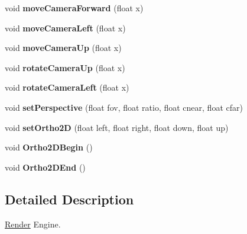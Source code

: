 \begin{DoxyCompactItemize}
\item 
\hypertarget{class_render_engine_a80c1ba74da94aa68ea3b262f16dbcfbe}{void {\bfseries move\-Camera\-Forward} (float x)}\label{class_render_engine_a80c1ba74da94aa68ea3b262f16dbcfbe}

\item 
\hypertarget{class_render_engine_add9933a517cc6899cc47edb376675c18}{void {\bfseries move\-Camera\-Left} (float x)}\label{class_render_engine_add9933a517cc6899cc47edb376675c18}

\item 
\hypertarget{class_render_engine_ac5708ab17601842d4c1740ffffb1efc1}{void {\bfseries move\-Camera\-Up} (float x)}\label{class_render_engine_ac5708ab17601842d4c1740ffffb1efc1}

\item 
\hypertarget{class_render_engine_ab59b72e8484098100cb81a8a10eb1f46}{void {\bfseries rotate\-Camera\-Up} (float x)}\label{class_render_engine_ab59b72e8484098100cb81a8a10eb1f46}

\item 
\hypertarget{class_render_engine_aab2507d056198b6c0a1cdce8052c8c7e}{void {\bfseries rotate\-Camera\-Left} (float x)}\label{class_render_engine_aab2507d056198b6c0a1cdce8052c8c7e}

\item 
\hypertarget{class_render_engine_ab56b031101cd39b934e8a2a1bf1bb578}{void {\bfseries set\-Perspective} (float fov, float ratio, float cnear, float cfar)}\label{class_render_engine_ab56b031101cd39b934e8a2a1bf1bb578}

\item 
\hypertarget{class_render_engine_a93628cf3d21428f0f6562727335e67fc}{void {\bfseries set\-Ortho2\-D} (float left, float right, float down, float up)}\label{class_render_engine_a93628cf3d21428f0f6562727335e67fc}

\item 
\hypertarget{class_render_engine_a17af2e852997b7d7a8f126e4223f54d2}{void {\bfseries Ortho2\-D\-Begin} ()}\label{class_render_engine_a17af2e852997b7d7a8f126e4223f54d2}

\item 
\hypertarget{class_render_engine_a20191c71cb16bd08e0052a9b3088701f}{void {\bfseries Ortho2\-D\-End} ()}\label{class_render_engine_a20191c71cb16bd08e0052a9b3088701f}

\end{DoxyCompactItemize}


\subsection{Detailed Description}
\hyperlink{class_render}{Render} Engine. 

